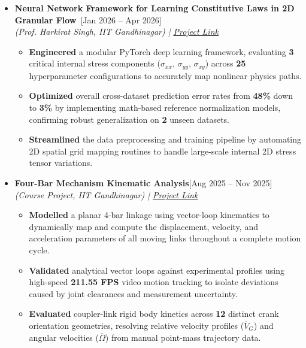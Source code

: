 \documentclass[a4paper,10pt]{article}
\newcommand{\isep}{-4 pt}
\newcommand{\resheading}[1]{{\small \colorbox{mygrey}{\begin{minipage}{0.965\textwidth}{\textbf{#1 \vphantom{p\^{E}}}}\end{minipage}}}}
\begin{document}
\vspace{0.15cm}
\indent\resheading{\textbf{PROJECTS}}
\vspace{-0.35cm}
\begin{itemize} \itemsep \isep
    
    \item \textbf{Neural Network Framework for Learning Constitutive Laws in 2D Granular Flow}\ \hfill [Jan 2026 -- Apr 2026] \\
 \emph{(Prof. Harkirat Singh, IIT Gandhinagar) 
 | \underline{\href{https://github.com/TagalpallewarAbhishek/Neural-Network-Framework-for-Learning-Constitutive-Laws-in-2D-Granular-Flow}{Project Link}}}
 \\[-0.7cm]
 
    \begin{itemize} \itemsep \isep
        \item \textbf{Engineered} a modular PyTorch deep learning framework, evaluating \textbf{3} critical internal stress components ($\sigma_{xx}$, $\sigma_{yy}$, $\sigma_{xy}$) across \textbf{25} hyperparameter configurations to accurately map nonlinear physics paths.
        \item \textbf{Optimized} overall cross-dataset prediction error rates from \textbf{48\%} down to \textbf{3\%} by implementing math-based reference normalization models, confirming robust generalization on \textbf{2} unseen datasets.
        \item \textbf{Streamlined} the data preprocessing and training pipeline by automating 2D spatial grid mapping routines to handle large-scale internal 2D stress tensor variations.
    \end{itemize}

   \item \textbf{Four-Bar Mechanism Kinematic Analysis}\hfill [Aug 2025 -- Nov 2025] \\
\emph{(Course Project, IIT Gandhinagar)
| \underline{\href{https://github.com/TagalpallewarAbhishek/Four-Bar-Mechanism-Kinematic-Analysis}{Project Link}}}
\\[-0.7cm]

\begin{itemize}\itemsep \isep
    \item \textbf{Modelled} a planar 4-bar linkage using vector-loop kinematics to dynamically map and compute the displacement, velocity, and acceleration parameters of all moving links throughout a complete motion cycle.
    \item \textbf{Validated} analytical vector loops against experimental profiles using high-speed \textbf{211.55 FPS} video motion tracking to isolate deviations caused by joint clearances and measurement uncertainty.
    \item \textbf{Evaluated} coupler-link rigid body kinetics across \textbf{12} distinct crank orientation geometries, resolving relative velocity profiles ($\overline{V}_G$) and angular velocities ($\overline{\Omega}$) from manual point-mass trajectory data.
\end{itemize}


\end{itemize}
\end{document}
